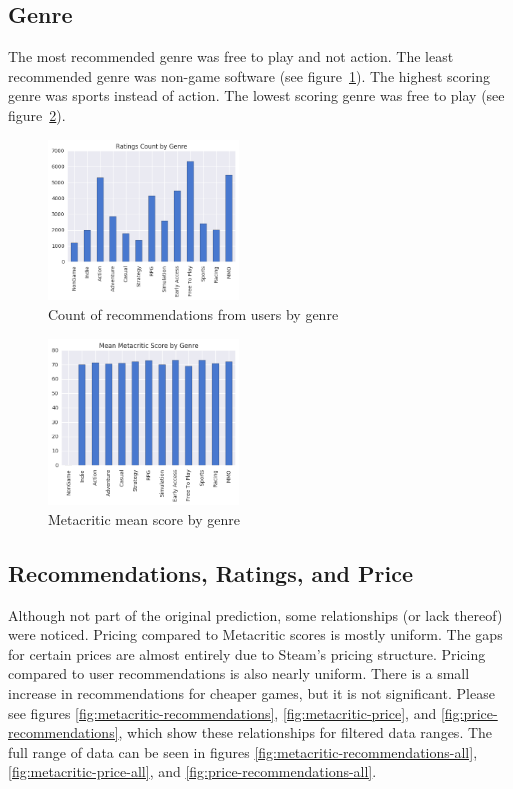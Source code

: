 \documentclass[10pt,journal,compsoc]{IEEEtran}
\begin{document}
\subsection{Genre}

The most recommended genre was free to play and not action. The least
recommended genre was non-game software (see figure~\ref{fig:genre-ratings}).
The highest scoring genre was sports instead of action. The lowest
scoring genre was free to play (see figure~\ref{fig:genre-metacritic}).

\begin{figure}[h]
    \caption{Count of recommendations from users by genre \label{fig:genre-ratings}}
    \includegraphics[width=0.45\textwidth,keepaspectratio]{genre-ratings-bar}
\end{figure}

\begin{figure}[h]
    \caption{Metacritic mean score by genre \label{fig:genre-metacritic}}
    \includegraphics[width=0.45\textwidth,keepaspectratio]{genre-metacritic-bar}
\end{figure}

\subsection{Recommendations, Ratings, and Price}

Although not part of the original prediction, some relationships (or lack
thereof) were noticed. Pricing compared to Metacritic scores is mostly
uniform. The gaps for certain prices are almost entirely due to Steam's
pricing structure. Pricing compared to user recommendations is also nearly
uniform. There is a small increase in recommendations for cheaper games, but
it is not significant. Please see figures
\ref{fig:metacritic-recommendations},
\ref{fig:metacritic-price}, and
\ref{fig:price-recommendations}, which show these relationships for filtered
data ranges. The full range of data can be seen in figures
\ref{fig:metacritic-recommendations-all},
\ref{fig:metacritic-price-all}, and
\ref{fig:price-recommendations-all}.
\end{document}
